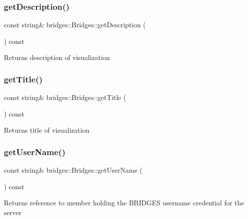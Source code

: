 \subsubsection{\texorpdfstring{getDescription()}{getDescription()}}
{\footnotesize\ttfamily const string\& bridges\+::\+Bridges\+::get\+Description (\begin{DoxyParamCaption}{ }\end{DoxyParamCaption}) const\hspace{0.3cm}{\ttfamily [inline]}}

\begin{DoxyReturn}{Returns}
description of visualization 
\end{DoxyReturn}
\mbox{\label{classbridges_1_1_bridges_a8fe8c79b0f852c0049a699c801e40a61}} 
\subsubsection{\texorpdfstring{getTitle()}{getTitle()}}
{\footnotesize\ttfamily const string\& bridges\+::\+Bridges\+::get\+Title (\begin{DoxyParamCaption}{ }\end{DoxyParamCaption}) const\hspace{0.3cm}{\ttfamily [inline]}}

\begin{DoxyReturn}{Returns}
title of visualization 
\end{DoxyReturn}
\mbox{\label{classbridges_1_1_bridges_ad16be2d94936fd555bc05f58c8c21f50}} 
\subsubsection{\texorpdfstring{getUserName()}{getUserName()}}
{\footnotesize\ttfamily const string\& bridges\+::\+Bridges\+::get\+User\+Name (\begin{DoxyParamCaption}{ }\end{DoxyParamCaption}) const\hspace{0.3cm}{\ttfamily [inline]}}

\begin{DoxyReturn}{Returns}
reference to member holding the B\+R\+I\+D\+G\+ES username credential for the server 
\end{DoxyReturn}
\mbox{\label{classbridges_1_1_bridges_a6c2897b19a25989e09c031152a74317d}} 
